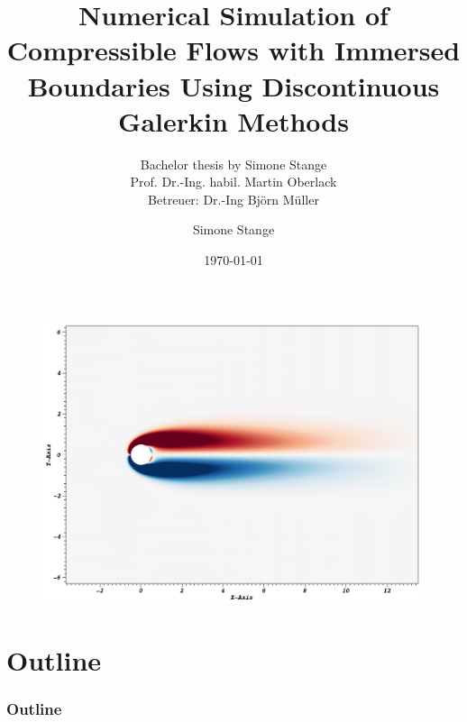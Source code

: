 \documentclass[accentcolor=tud7b,colorbacktitle,inverttitle,landscape,presentation,t]{tudbeamer}
\begin{document}
\title{Numerical Simulation of Compressible Flows with Immersed Boundaries Using Discontinuous Galerkin Methods}
\subtitle{Bachelor thesis by Simone Stange\\Prof. Dr.-Ing. habil. Martin Oberlack\\Betreuer: Dr.-Ing Björn Müller}

\author[Simone Stange]{Simone Stange}


\date{\today}

\begin{titleframe}
	\begin{figure}[htbp] 
	    \centering
		\includegraphics[height=0.38\textwidth]{img/Re40DG3CpD60} 
	\end{figure}
\end{titleframe}

\section*{Outline}
\begin{frame}
	\frametitle{Outline}
	\tableofcontents
\end{frame}




	
\appendix
	
\end{document}
